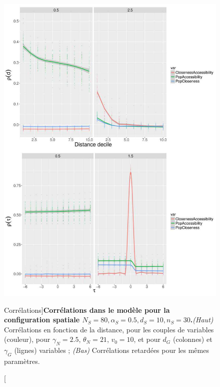 \begin{figure}
\includegraphics[width=\linewidth]{Figures/Final/6-1-3-fig-macrocoevolexplo-correlations.jpg}
	\caption[Correlations][Corrélations]{}{\textbf{Corrélations dans le modèle pour la configuration spatiale $N_S=80,\alpha_S=0.5,d_S=10,n_S=30$.}\textit{(Haut)} Corrélations en fonction de la distance, pour les couples de variables (couleur), pour $\gamma_N = 2.5$, $\theta_N = 21$, $v_0 = 10$, et pour $d_G$ (colonnes) et $\gamma_G$ (lignes) variables ; \textit{(Bas)} Corrélations retardées pour les mêmes paramètres.\label{fig:macrocoevolexplo:correlations}}
\end{figure}








\stars

















